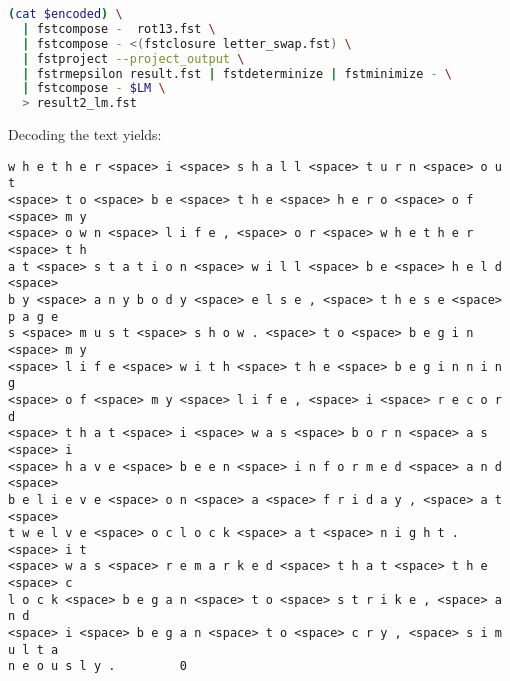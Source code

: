 \documentclass[a4paper,oneside,reqno]{amsart}
\begin{document}
\begin{enumerate}[label=\arabic*.]
\begin{enumerate}[label=(\alph*)]
\begin{lstlisting}[language=bash]
(cat $encoded) \
  | fstcompose -  rot13.fst \
  | fstcompose - <(fstclosure letter_swap.fst) \
  | fstproject --project_output \
  | fstrmepsilon result.fst | fstdeterminize | fstminimize - \
  | fstcompose - $LM \
  > result2_lm.fst
    \end{lstlisting}
    Decoding the text yields:
    \begin{verbatim}
w h e t h e r <space> i <space> s h a l l <space> t u r n <space> o u t
<space> t o <space> b e <space> t h e <space> h e r o <space> o f <space> m y
<space> o w n <space> l i f e , <space> o r <space> w h e t h e r <space> t h
a t <space> s t a t i o n <space> w i l l <space> b e <space> h e l d <space>
b y <space> a n y b o d y <space> e l s e , <space> t h e s e <space> p a g e
s <space> m u s t <space> s h o w . <space> t o <space> b e g i n <space> m y
<space> l i f e <space> w i t h <space> t h e <space> b e g i n n i n g
<space> o f <space> m y <space> l i f e , <space> i <space> r e c o r d
<space> t h a t <space> i <space> w a s <space> b o r n <space> a s <space> i
<space> h a v e <space> b e e n <space> i n f o r m e d <space> a n d <space>
b e l i e v e <space> o n <space> a <space> f r i d a y , <space> a t <space>
t w e l v e <space> o c l o c k <space> a t <space> n i g h t . <space> i t
<space> w a s <space> r e m a r k e d <space> t h a t <space> t h e <space> c
l o c k <space> b e g a n <space> t o <space> s t r i k e , <space> a n d
<space> i <space> b e g a n <space> t o <space> c r y , <space> s i m u l t a
n e o u s l y .         0
    \end{verbatim}
  \end{enumerate}
\end{enumerate}

%
%


\end{document}
